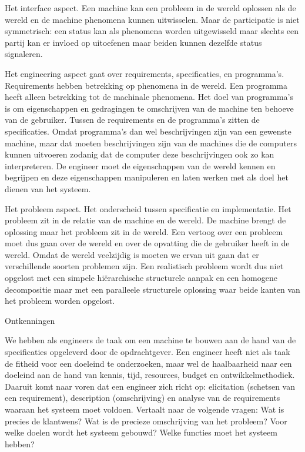 Het interface aspect. Een machine kan een probleem in de wereld oplossen als de wereld en de machine phenomena kunnen uitwisselen. Maar de participatie is niet symmetrisch: een status kan als phenomena worden uitgewisseld maar slechts een partij kan er invloed op uitoefenen maar beiden kunnen dezelfde status signaleren. 

Het engineering aspect gaat over requirements, specificaties, en programma’s. Requirements hebben betrekking op phenomena in de wereld. Een programma heeft alleen betrekking tot de machinale phenomena. Het doel van programma’s is om eigenschappen en gedragingen te omschrijven van de machine ten behoeve van de gebruiker. Tussen de requirements en de programma’s zitten de specificaties. Omdat programma’s dan wel beschrijvingen zijn van een gewenste machine, maar dat moeten beschrijvingen zijn van de  machines  die de computers kunnen uitvoeren zodanig dat de computer deze beschrijvingen ook zo kan interpreteren. De engineer moet  de eigenschappen van de wereld kennen en begrijpen en deze eigenschappen manipuleren en laten werken met als doel het dienen van het systeem. 

Het probleem aspect. Het onderscheid tussen specificatie en implementatie. Het probleem zit in de relatie van de machine en de wereld. De machine brengt de oplossing maar het probleem zit in de wereld. Een vertoog over een probleem moet dus gaan over de wereld en over de opvatting die de gebruiker heeft in de wereld. Omdat de wereld veelzijdig is moeten we ervan uit gaan dat er verschillende soorten problemen zijn. Een realistisch probleem wordt dus niet opgelost met een simpele hiërarchische structurele aanpak en een homogene decompositie maar met een paralleele structurele oplossing waar beide kanten van het probleem worden opgelost. 



Ontkenningen 

We hebben als engineers de taak om een machine te bouwen aan de hand van de specificaties opgeleverd door de opdrachtgever. Een engineer heeft niet als taak de fitheid voor een doeleind te onderzoeken, maar wel de haalbaarheid naar een doeleind aan de hand van kennis, tijd, resources, budget en ontwikkelmethodiek. Daaruit komt naar voren dat een engineer zich richt op: elicitation (schetsen van een requirement), description (omschrijving) en analyse van de requirements waaraan het systeem moet voldoen. Vertaalt naar de volgende vragen: Wat is precies de klantwens?  Wat is de precieze omschrijving van het probleem? Voor welke doelen wordt het systeem gebouwd? Welke functies moet het systeem hebben? 


